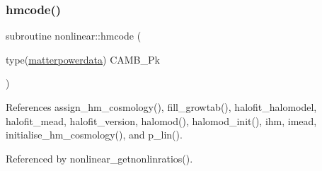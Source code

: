 \subsubsection{\texorpdfstring{hmcode()}{hmcode()}}
{\footnotesize\ttfamily subroutine nonlinear\+::hmcode (\begin{DoxyParamCaption}\item[{type(\mbox{\hyperlink{structtransfer_1_1matterpowerdata}{matterpowerdata}})}]{C\+A\+M\+B\+\_\+\+Pk }\end{DoxyParamCaption})\hspace{0.3cm}{\ttfamily [private]}}



References assign\+\_\+hm\+\_\+cosmology(), fill\+\_\+growtab(), halofit\+\_\+halomodel, halofit\+\_\+mead, halofit\+\_\+version, halomod(), halomod\+\_\+init(), ihm, imead, initialise\+\_\+hm\+\_\+cosmology(), and p\+\_\+lin().



Referenced by nonlinear\+\_\+getnonlinratios().

